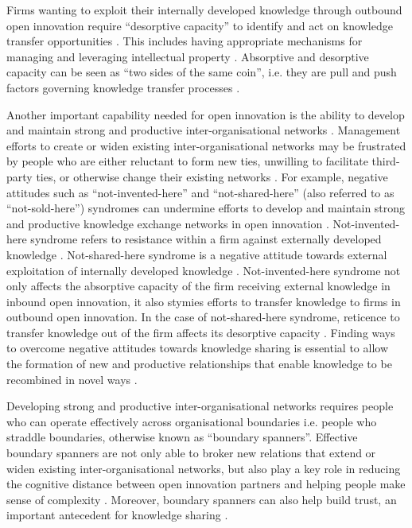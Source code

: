 Firms wanting to exploit their internally developed knowledge through outbound open innovation require \enquote{desorptive capacity} to identify and act on knowledge transfer opportunities \citep{lichtenthaler2010technology,denford2018absorption}. This includes having appropriate mechanisms for managing and leveraging intellectual property \citep{chesbrough2012open}. Absorptive and desorptive capacity can be seen as \enquote{two sides of the same coin}, i.e. they are pull and push factors governing knowledge transfer processes \citep{dell2015absorptive}. \medskip

Another important capability needed for open innovation is the ability to develop and maintain strong and productive inter\hyp{}organisational networks \citep{chesbrough2012open}. Management efforts to create or widen existing inter\hyp{}organisational networks may be frustrated by people who are either reluctant to form new ties, unwilling to facilitate third\hyp{}party ties, or otherwise change their existing networks \citep{davis2010agency}. For example, negative attitudes such as \enquote{not\hyp{}invented\hyp{}here} and \enquote{not\hyp{}shared\hyp{}here} (also referred to as \enquote{not\hyp{}sold\hyp{}here}) syndromes can undermine efforts to develop and maintain strong and productive knowledge exchange networks in open innovation \citep{lichtenthaler2006attitudes,de2014neither,podmetina2015skills}. Not\hyp{}invented\hyp{}here syndrome refers to resistance within a firm against externally developed knowledge \citep{katz1982investigating,hussinger2011search,antons2015opening}. Not\hyp{}shared\hyp{}here syndrome is a negative attitude towards external exploitation of internally developed knowledge \citep{chesbrough2003open,lichtenthaler2006attitudes,de2014neither}. Not\hyp{}invented\hyp{}here syndrome not only affects the absorptive capacity of the firm receiving external knowledge in inbound open innovation, it also stymies efforts to transfer knowledge to firms in outbound open innovation. In the case of not\hyp{}shared\hyp{}here syndrome, reticence to transfer knowledge out of the firm affects its desorptive capacity \citep{lichtenthaler2006attitudes}. Finding ways to overcome negative attitudes towards knowledge sharing is essential to allow the formation of new and productive relationships that enable knowledge to be recombined in novel ways \citep{nahapiet1998social,obstfeld2005social,davis2010agency,meyer2010rise,hussinger2011search}. \medskip

Developing strong and productive inter\hyp{}organisational networks requires people who can operate effectively across organisational boundaries i.e. people who straddle boundaries, otherwise known as \enquote{boundary spanners}. Effective boundary spanners are not only able to broker new relations that extend or widen existing inter\hyp{}organisational networks, but also play a key role in reducing the cognitive distance between open innovation partners and helping people make sense of complexity \citep{tushman1981boundary,fleming2007brokerage,goffin2010managing}. Moreover, boundary spanners can also help build trust, an important antecedent for knowledge sharing \citep{levin2004strength,renzl2008trust,meyer2010rise,sankowska2013relationships,kucharska2016trust}. \medskip

